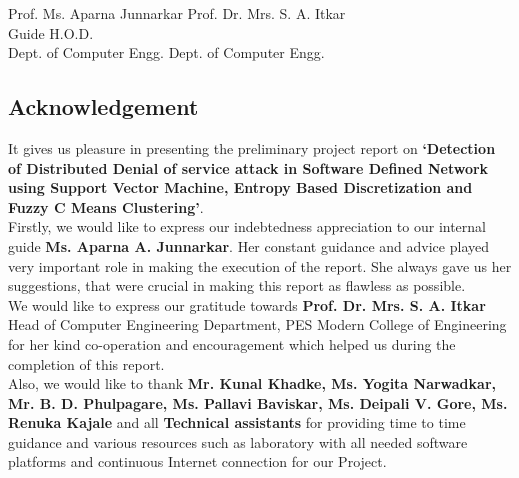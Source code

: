 \documentclass[12pt,a4paper,final]{report}
\begin{document}
\begin{center}
\vspace{3cm}
\hspace*{0.8cm}
Prof. Ms. Aparna Junnarkar
\hspace{6cm}
Prof. Dr. Mrs. S. A. Itkar \\
\hspace*{0.8cm}
Guide
\hspace{9.6cm}
H.O.D. \\
\hspace*{1cm}
Dept. of Computer Engg.
\hspace{6.4cm}
Dept. of Computer Engg. \\
\end{center}

\thispagestyle{empty}
\Large
\begin{center}
\chapter*{\centering Acknowledgement}
\end{center}
\normalsize
It gives us pleasure in presenting the preliminary project report on \textbf{`Detection of Distributed Denial of service attack in Software Defined Network using Support Vector Machine, Entropy Based Discretization and Fuzzy C Means Clustering'}.\\

Firstly, we would like to express our indebtedness appreciation to our internal guide \textbf{Ms. Aparna A. Junnarkar}. Her constant guidance and advice played very important role in making the execution of the report. She always gave us her suggestions, that were crucial in making this report as flawless as possible.\\

We would like to express our gratitude towards \textbf{Prof. Dr. Mrs. S. A. Itkar}  Head of Computer Engineering Department, PES Modern College of Engineering for her kind co-operation and encouragement which helped us during the completion of this report.\\

Also, we would like to thank \textbf{Mr. Kunal Khadke, Ms. Yogita Narwadkar, Mr. B. D. Phulpagare, Ms. Pallavi Baviskar, Ms. Deipali V. Gore, Ms. Renuka Kajale} and all \textbf{Technical assistants} for providing time to time guidance and various resources such as laboratory with all needed software platforms and continuous Internet connection for our Project.\\
\end{document}

